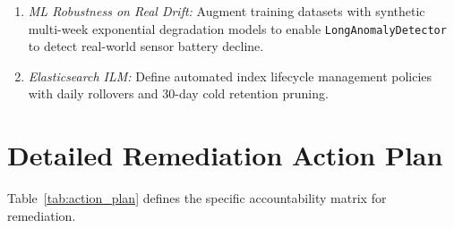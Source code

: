 \documentclass[10pt,a4paper]{report}
\begin{document}
\begin{itemize}[leftmargin=*]
\begin{enumerate}
    \item \textit{ML Robustness on Real Drift:} Augment training datasets with synthetic multi-week exponential degradation models to enable \texttt{LongAnomalyDetector} to detect real-world sensor battery decline.
    \item \textit{Elasticsearch ILM:} Define automated index lifecycle management policies with daily rollovers and 30-day cold retention pruning.
  \end{enumerate}
\end{itemize}

\section{Detailed Remediation Action Plan}
Table~\ref{tab:action_plan} defines the specific accountability matrix for remediation.
\end{document}
